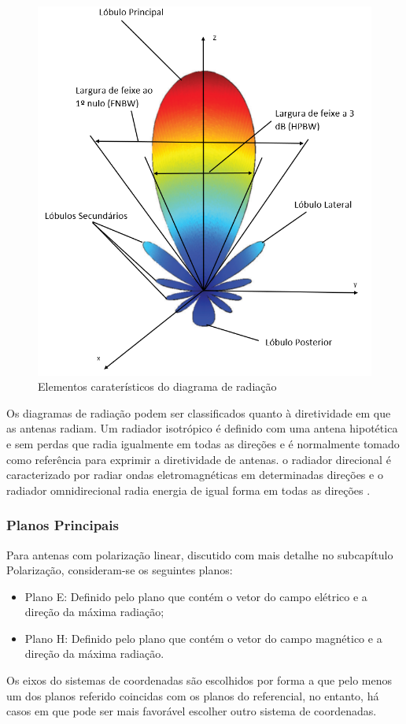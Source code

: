 \begin{figure}[h]
\centering
\includegraphics[scale=0.6]{chapters/ch3/assets/elem_carat_dg}
\caption[Elementos caraterísticos do diagrama de radiação]{Elementos caraterísticos do diagrama de radiação}
\label{fig:elem_carat_dg}
\end{figure}

Os diagramas de radiação podem ser classificados quanto à diretividade em que as antenas radiam. Um radiador isotrópico é definido com uma antena hipotética e sem perdas que radia igualmente em todas as direções e é normalmente tomado como referência para exprimir a diretividade de antenas. o radiador direcional é caracterizado por radiar ondas eletromagnéticas em determinadas direções e o radiador omnidirecional radia energia de igual forma em todas as direções \parencite{Balanis2016}.

\subsubsection*{Planos Principais}
Para antenas com polarização linear, discutido com mais detalhe no subcapítulo Polarização, consideram-se os seguintes planos:
\begin{itemize}
\item Plano E: Definido pelo plano que contém o vetor do campo elétrico e a direção da máxima radiação;
\item Plano H: Definido pelo plano que contém o vetor do campo magnético e a direção da máxima radiação.
\end{itemize}
Os eixos do sistemas de coordenadas são escolhidos por forma a que pelo menos um dos planos referido coincidas com os planos do referencial, no entanto, há casos em que pode ser mais favorável escolher outro sistema de coordenadas.



